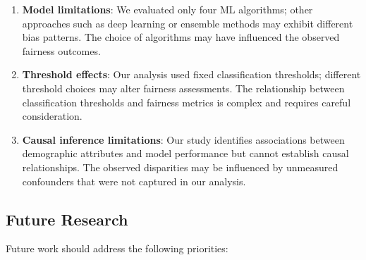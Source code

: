 \begin{enumerate}[leftmargin=*]
    \item \textbf{Model limitations}: We evaluated only four ML algorithms; 
          other approaches such as deep learning or ensemble methods may 
          exhibit different bias patterns. The choice of algorithms may 
          have influenced the observed fairness outcomes.
    
    \item \textbf{Threshold effects}: Our analysis used fixed classification 
          thresholds; different threshold choices may alter fairness 
          assessments. The relationship between classification thresholds 
          and fairness metrics is complex and requires careful consideration.
    
    \item \textbf{Causal inference limitations}: Our study identifies 
          associations between demographic attributes and model performance 
          but cannot establish causal relationships. The observed disparities 
          may be influenced by unmeasured confounders that were not captured 
          in our analysis.
\end{enumerate}

\subsection{Future Research}

Future work should address the following priorities:

